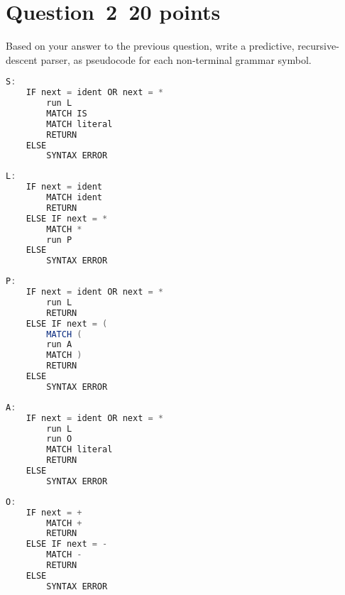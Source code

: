 \documentclass[10pt]{article}
\begin{document}
\section*{Question~2~\hfill 20 points}

Based on your answer to the previous question, 
write a predictive, recursive-descent parser,
as pseudocode for each non-terminal grammar symbol.

\newpage
\begin{framed}
\begin{lstlisting}[language=Java, style=jvm]
S:
    IF next = ident OR next = *
        run L
        MATCH IS
        MATCH literal
        RETURN
    ELSE
        SYNTAX ERROR
\end{lstlisting}
\end{framed}

\begin{framed}
\begin{lstlisting}[language=Java, style=jvm]
L:
    IF next = ident
        MATCH ident
        RETURN
    ELSE IF next = *
        MATCH *
        run P
    ELSE
        SYNTAX ERROR
\end{lstlisting}
\end{framed}

\begin{framed}
\begin{lstlisting}[language=Java, style=jvm]
P:
    IF next = ident OR next = *
        run L
        RETURN
    ELSE IF next = (
        MATCH (
        run A
        MATCH )
        RETURN
    ELSE
        SYNTAX ERROR
\end{lstlisting}
\end{framed}

\begin{framed}
\begin{lstlisting}[language=Java, style=jvm]
A:
    IF next = ident OR next = *
        run L
        run O
        MATCH literal
        RETURN
    ELSE
        SYNTAX ERROR
\end{lstlisting}
\end{framed}

\begin{framed}
\begin{lstlisting}[language=Java, style=jvm]
O:
    IF next = +
        MATCH +
        RETURN
    ELSE IF next = -
        MATCH -
        RETURN
    ELSE
        SYNTAX ERROR
\end{lstlisting}
\end{framed}
\end{document}
